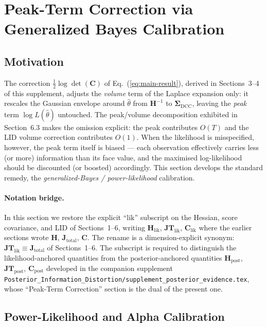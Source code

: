\documentclass[11pt]{article}
\begin{document}
\section{Peak-Term Correction via Generalized Bayes Calibration}
\label{sec:peak-correction-lik}

\subsection{Motivation}
\label{sec:peak-motivation-lik}

The correction $\tfrac{1}{2}\log\det(\mathbf C)$ of Eq.~(\ref{eq:main-result}), derived in Sections~3--4 of this supplement, adjusts the \emph{volume} term of the Laplace expansion only: it rescales the Gaussian envelope around $\hat\theta$ from $\mathbf H^{-1}$ to $\boldsymbol\Sigma_{\mathrm{DCC}}$, leaving the \emph{peak} term $\log L(\hat\theta)$ untouched. The peak/volume decomposition exhibited in Section~6.3 makes the omission explicit: the peak contributes $O(T)$ and the LID volume correction contributes $O(1)$. When the likelihood is misspecified, however, the peak term itself is biased --- each observation effectively carries less (or more) information than its face value, and the maximised log-likelihood should be discounted (or boosted) accordingly. This section develops the standard remedy, the \emph{generalized-Bayes / power-likelihood} calibration.

\paragraph{Notation bridge.} In this section we restore the explicit ``$\mathrm{lik}$'' subscript on the Hessian, score covariance, and LID of Sections~1--6, writing $\mathbf H_{\mathrm{lik}}$, $\mathbf{JT}_{\mathrm{lik}}$, $\mathbf C_{\mathrm{lik}}$ where the earlier sections wrote $\mathbf H$, $\mathbf J_{\mathrm{total}}$, $\mathbf C$. The rename is a dimension-explicit synonym: $\mathbf{JT}_{\mathrm{lik}} \equiv \mathbf J_{\mathrm{total}}$ of Sections~1--6. The subscript is required to distinguish the likelihood-anchored quantities from the posterior-anchored quantities $\mathbf H_{\mathrm{post}}$, $\mathbf{JT}_{\mathrm{post}}$, $\mathbf C_{\mathrm{post}}$ developed in the companion supplement \texttt{Posterior\_Information\_Distortion/sup\-ple\-ment\_pos\-ter\-i\-or\_ev\-i\-dence.tex}, whose ``Peak-Term Correction'' section is the dual of the present one.

\subsection{Power-Likelihood and Alpha Calibration}
\label{sec:power-lik}
\end{document}
